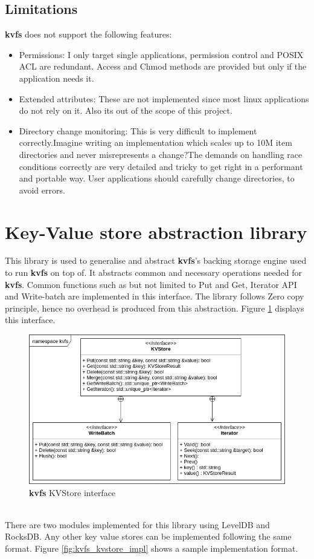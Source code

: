 \documentclass[bsc,frontabs,twoside,singlespacing,parskip,deptreport]{infthesis}     %
\begin{document}
{\subsection{Limitations}
{\bf kvfs} does not support the following features:
\begin{itemize}
	\item Permissions: I only target single applications, permission control and POSIX ACL are redundant. Access and Chmod methods are provided but only if the application needs it.
	\item Extended attributes:  These are not implemented since most linux applications do not rely on it. Also its out of the scope of this project.
	\item Directory change monitoring: This is very difficult to implement correctly.Imagine writing an implementation which scales up to 10M item directories and never misrepresents a change?The demands on handling race conditions correctly are very detailed and tricky to get right in a performant and portable way. User applications should carefully change directories, to avoid errors.
\end{itemize}
\section{Key-Value store abstraction library} \label{kvstore_abstract}
This library is used to generalise and abstract {\bf kvfs}'s backing storage engine used to run  {\bf kvfs} on top of. It abstracts common and necessary operations needed for {\bf kvfs}. Common functions such as but not limited to Put and Get, Iterator API and Write-batch are implemented in this interface.  The library follows Zero copy principle, hence no overhead is produced from this abstraction. Figure \ref{fig:kvfs_KVStore_abstraction} displays this interface.
\begin{figure}[h!]
	\centering
	\includegraphics[scale=0.6]{diagrams/kvfs_KVStore_abstraction.png}
	\caption{ {\bf kvfs} KVStore interface}
	 \label{fig:kvfs_KVStore_abstraction}
\end{figure}
\\
There are two modules implemented for this library using LevelDB and RocksDB. Any other key value stores can be implemented following the same format. Figure \ref{fig:kvfs_kvstore_impl} shows a sample implementation format.

}
\end{document}
